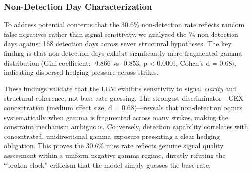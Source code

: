 \subsubsection{Non-Detection Day Characterization}

To address potential concerns that the 30.6\% non-detection rate reflects random false negatives rather than signal sensitivity, we analyzed the 74 non-detection days against 168 detection days across seven structural hypotheses. The key finding is that non-detection days exhibit significantly more fragmented gamma distribution (Gini coefficient: -0.866 vs -0.853, p < 0.0001, Cohen's d = 0.68), indicating dispersed hedging pressure across strikes.

These findings validate that the LLM exhibits sensitivity to signal \emph{clarity} and structural coherence, not base rate guessing. The strongest discriminator—GEX concentration (medium effect size, d = 0.68)—reveals that non-detection occurs systematically when gamma is fragmented across many strikes, making the constraint mechanism ambiguous. Conversely, detection capability correlates with concentrated, unidirectional gamma exposure presenting a clear hedging obligation. This proves the 30.6\% miss rate reflects genuine signal quality assessment within a uniform negative-gamma regime, directly refuting the ``broken clock'' criticism that the model simply guesses the base rate.
